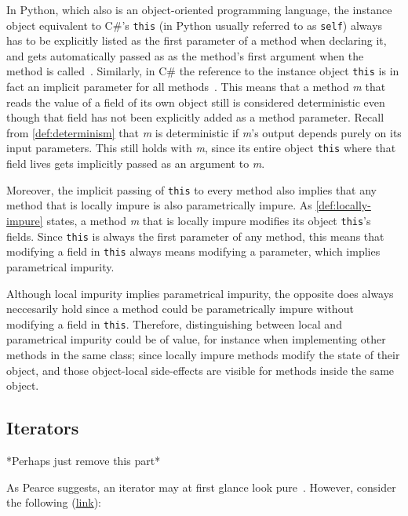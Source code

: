 \documentclass[a4paper,12pt]{article}
\begin{document}
In Python, which also is an object-oriented programming language, the instance object equivalent to C\#'s \texttt{this} (in Python usually referred to as \texttt{self}) always has to be explicitly listed as the first parameter of a method when declaring it, and gets automatically passed as as the method's first argument when the method is called~\cite{python-classes}. Similarly, in C\# the reference to the instance object \texttt{this} is in fact an implicit parameter for all methods~\cite{michaelis2018essential}. This means that a method \textit{m} that reads the value of a field of its own object still is considered deterministic even though that field has not been explicitly added as a method parameter. Recall from \autoref{def:determinism} that \textit{m} is deterministic if \textit{m}'s output depends purely on its input parameters. This still holds with \textit{m}, since its entire object \texttt{this} where that field lives gets implicitly passed as an argument to \textit{m}.

Moreover, the implicit passing of \texttt{this} to every method also implies that any method that is locally impure is also parametrically impure. As \autoref{def:locally-impure} states, a method \textit{m} that is locally impure modifies its object \texttt{this}'s fields. Since \texttt{this} is always the first parameter of any method, this means that modifying a field in \texttt{this} always means modifying a parameter, which implies parametrical impurity.

Although local impurity implies parametrical impurity, the opposite does always neccesarily hold since a method could be parametrically impure without modifying a field in \texttt{this}. Therefore, distinguishing between local and parametrical impurity could be of value, for instance when implementing other methods in the same class; since locally impure methods modify the state of their object, and those object-local side-effects are visible for methods inside the same object.

\subsection{Iterators} \label{sub:iterators}

*Perhaps just remove this part*


As Pearce suggests, an iterator may at first glance look pure~\cite{pearce2011jpure}. However, consider the following (\href{https://docs.microsoft.com/en-us/archive/msdn-magazine/2017/april/essential-net-understanding-csharp-foreach-internals-and-custom-iterators-with-yield}{link}):
\end{document}
